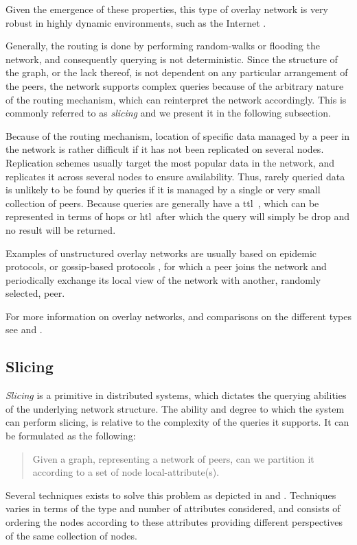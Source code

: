 \documentclass[12pt, titlepage]{uo_temp}
\begin{document}
     Given the emergence of these properties, this type of overlay network is very robust
     in highly dynamic environments, such as the Internet \cite{birman2007promise}. 
     
     Generally, the routing is done by performing random-walks or flooding the network,
     and consequently querying is not deterministic. Since the structure of the graph, or
     the lack thereof, is not dependent on any particular arrangement of the peers, the
     network supports complex queries because of the arbitrary nature of the routing
     mechanism, which can reinterpret the network accordingly. This is commonly referred
     to as \emph{slicing} and we present it in the following subsection.

     Because of the routing mechanism, location of specific data managed by a peer in
     the network is rather difficult if it has not been replicated on several
     nodes. Replication schemes usually target the most popular data in the network, and
     replicates it across several nodes to ensure availability. Thus, rarely queried data
     is unlikely to be found by queries if it is managed by a single or very small
     collection of peers. Because queries are generally have a \gls{ttl}\ , which
     can be represented in terms of hops or \gls{htl}\ after which the query will simply be
     drop and no result will be returned.

     Examples of unstructured overlay networks are usually based on epidemic protocols, or
     gossip-based protocols \cite{riviere2011gossip}, for which a peer joins the network
     and periodically exchange its local view of the network with another, randomly
     selected, peer. 
     
     For more information on overlay networks, and comparisons on the different types see
     \cite{lua2005survey} and \cite{p2p_collab}. 
     
     \subsection{Slicing}\label{bkg_slice} 

     \emph{Slicing} is a primitive in distributed systems, which dictates the querying
     abilities of the underlying network structure. The ability and degree
     to which the system can perform slicing, is relative to the complexity of the queries
     it supports. It can be formulated as the following:
     \begin{quote}
       Given a graph, representing a network of peers, can we partition it according to a
       set of node local-attribute(s).
     \end{quote}
     Several techniques exists to solve this problem as depicted in
     \cite{jelasity2006ordered} and \cite{pasquet2014autonomous}. Techniques varies in
     terms of the type and number of attributes considered, and consists of ordering the
     nodes according to these attributes providing different perspectives of the same
     collection of nodes.
\end{document}
